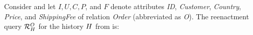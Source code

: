 \begin{exam}\label{ex:reenact-example}
  Consider  and let $I,U,C,P$, and $F$ denote attributes \emph{ID}, \emph{Customer}, \emph{Country}, \emph{Price}, and \emph{ShippingFee} of relation \emph{Order} (abbreviated as \emph{O}). The reenactment query $\mathcal{R}^{O}_{H}$ for the history $H$ from  is:

\vspace{-1mm}
\end{exam}
